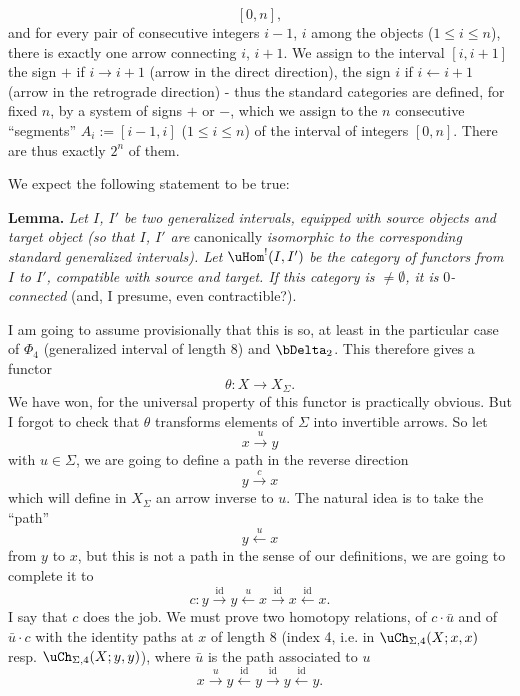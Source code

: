 \[
[0,n],
\]
and for every pair of consecutive integers $i-1$, $i$ among the objects ($1 \leq i \leq n$), there is exactly one arrow connecting $i$, $i+1$. We assign to the interval $[i,i+1]$ the sign $+$ if $i \longrightarrow i+1$ (arrow in the direct direction), the sign $i$ if $i \longleftarrow i+1$ (arrow in the retrograde direction) - thus the standard categories are defined, for fixed $n$, by a system of signs $+$ or $-$, which we assign to the $n$ consecutive ``segments'' $A_i := [i-1,i]$ ($1 \leq i \leq n$) of the interval of integers $[0,n]$. There are thus exactly $2^n$ of them.

We expect the following statement to be true:

\textbf{Lemma.} \textit{Let $I$, $I'$ be two generalized intervals, equipped with source objects and target object (so that $I$, $I'$ are} canonically \textit{isomorphic to the corresponding standard generalized intervals). Let} $\uHom^!(I,I')$ %
\textit{be the category of functors from $I$ to $I'$, compatible with source and target. If this category is $\neq \emptyset$, it is} 0\textit{-connected} (and, I presume, even contractible?).

I am going to assume provisionally that this is so, at least in the particular case of $\Phi_4$ (generalized interval of length 8) and $\bDelta_2$. This therefore gives a functor
\[
\theta : X \longrightarrow X_\Sigma.
\]
We have won, for the universal property of this functor is practically obvious. But I forgot to check that $\theta$ transforms elements of $\Sigma$ into invertible arrows. So let
\[
x \xrightarrow{u} y
\]
with $u \in \Sigma$, we are going to define a path in the reverse direction
\[
y \xrightarrow{c} x
\]
which will define in $X_\Sigma$ an arrow inverse to $u$. The natural idea is to take the ``path''
\[
y \xleftarrow{u} x
\]
from $y$ to $x$, but this is not a path in the sense of our definitions, we are going to complete it to
\[
c : y \xrightarrow{\mathrm{id}} y \xleftarrow{u} x \xrightarrow{\mathrm{id}} x \xleftarrow{\mathrm{id}} x.
\]
I say that $c$ does the job. We must prove two homotopy relations, of $c \cdot \bar{u}$ and of $\bar{u} \cdot c$ with the identity paths at $x$ of length 8 (index 4, i.e. in $\uCh_{\Sigma,4}(X;x,x)$ resp. $\uCh_{\Sigma,4}(X;y,y)$),
where $\bar{u}$ is the path associated to $u$
\[
x \xrightarrow{u} y \xleftarrow{\mathrm{id}} y \xrightarrow{\mathrm{id}} y \xleftarrow{\mathrm{id}} y.
\]

